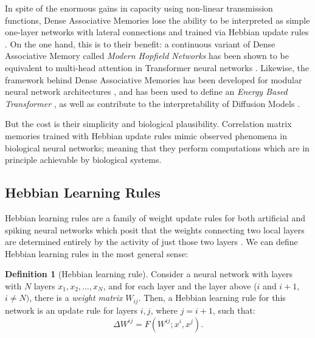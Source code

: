\documentclass{article}
\theoremstyle{definition}
\newtheorem{definition}{Definition}[subsection]
\begin{document}
In spite of the enormous gains in capacity using non-linear
transmission functions, Dense Associative Memories lose the ability
to be interpreted as simple one-layer networks with lateral connections
and trained via Hebbian update rules
\parencites{krotov_large_2021,mcalister_sequential_2025}.
On the one hand, this is to their benefit: a continuous variant of
Dense Associative
Memory called \textit{Modern Hopfield Networks} has been shown to be
equivalent to multi-head attention in Transformer neural networks
\parencites{ramsauer_hopfield_2021,vaswani_attention_2023}. Likewise,
the framework behind Dense Associative Memories has been developed for
modular neural network architectures \parencite{krotov_hierarchical_2021},
and has been used to define an \textit{Energy Based Transformer}
\parencite{hoover_energy_2023}, as well as contribute to the interpretability
of Diffusion Models \parencite{pham_memorization_2025}.

But the cost is their simplicity and biological plausibility.
Correlation matrix memories
trained with Hebbian update rules mimic observed phenomena in
biological neural networks; meaning that they perform computations
which are in principle achievable by biological systems.

\subsection{Hebbian Learning Rules}\label{sec:hebbian-learning-rules}


Hebbian learning rules are a family of weight update rules for both
artificial and spiking neural networks which posit that
the weights connecting two local layers are determined entirely
by the activity of just those two layers
\parencites{hebb_organization_1949,sejnowski_hebb_1989}.
We can define Hebbian learning rules in the most general sense:
\begin{definition}[Hebbian learning rule]\label{def:hebbian-learning-rule}
  Consider a neural network with layers with $N$ layers $x_{1}, x_2,
  \dots, x_N$,
  and for each layer and the layer above ($i$ and $i + 1$, $i \neq N)$, there
  is a \textit{weight matrix} $W_{ij}$. Then, a Hebbian learning rule for this
  network is an update rule for layers $i, j$, where $j = i + 1$, such that:
  \begin{equation}
    \Delta W^{ij} = F(W^{ij}; x^i, x^j).
  \end{equation}
\end{definition}
\end{document}
